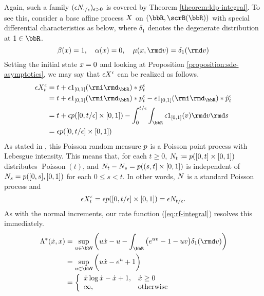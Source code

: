 \begin{example}[Poisson]
  Again, such a family $(\epsilon N_{\cdot/\epsilon})_{\epsilon>0}$ is covered by Theorem \ref{theorem:ldp-integral}.
  To see this, consider a base affine process $X$ on $(\bbR, \scrB(\bbR))$ with special differential characteristics as below, where $\delta_1$ denotes the degenerate distribution at $1 \in \bbR$.
  \begin{equation*}
    \affDrift(\stateVar) = 1, \quad \affDiff(\stateVar) = 0, \quad \affJump(\stateVar, \rmd\markVar) = \delta_1(\rmd\markVar)
  \end{equation*}
  Setting the initial state $x = 0$ and looking at Proposition \ref{proposition:sde-asymptotics}, we may say that $\epsilon X^\epsilon$ can be realized as follows.
  \begin{align*}
    \Xe_t 
    &= t + \epsilon 1_{[0,1]}(\id_\bbR) \ast \compensate{\poisRM^\epsilon}_t \\
    &= t + \epsilon 1_{[0,1]}(\id_\bbR) \ast \poisRM^\epsilon_t - \epsilon 1_{[0,1]}(\id_\bbR) \ast \predproj{\poisRM^\epsilon}_t \\
    &= t + \epsilon \poisRM([0,t/\epsilon] \times [0,1]) - \int_0^{t/\epsilon} \int_\bbR \epsilon 1_{[0,1]}(\markVar) \rmd\markVar \rmd s \\
    &= \epsilon \poisRM([0,t/\epsilon] \times [0,1])
  \end{align*}
  As stated in \cite[Theorem II.4.8]{jacod2003}, this Poisson random measure $p$ is a Poisson point process with Lebesgue intensity.
  This means that, for each $t \geq 0$, $N_t \coloneqq p([0,t] \times [0,1])$ distributes $\operatorname{Poisson}(t)$, and $N_t - N_s = p((s,t] \times [0,1])$ is independent of $N_s = p([0,s], [0,1])$ for each $0 \leq s < t$.
  In other words, $N$ is a standard Poisson process and
  \begin{equation*}
    \epsilon X^\epsilon_t = \epsilon p([0,t/\epsilon] \times [0,1]) = \epsilon N_{t/\epsilon}.
  \end{equation*}
  As with the normal increments, our rate function (\ref{eq:rf-integral}) resolves this immediately.
  \begin{align*}
    \ode^*(\diffVar, \stateVar) 
    &= \sup_{\momentVar\in\vecSpace} \bigg( \momentVar\diffVar - \momentVar - \int_\bbR \big( e^{\momentVar\markVar} - 1 - \momentVar\markVar \big) \delta_1(\rmd\markVar) \bigg)  \\
    &= \sup_{\momentVar\in\vecSpace} \bigg( \momentVar\diffVar - e^\momentVar + 1 \bigg) \\
    &= \left\{\begin{array}{ll}
      \diffVar \log\diffVar - \diffVar + 1, & \diffVar \geq 0 \\
      \infty, & \text{otherwise}
    \end{array}\right.
  \end{align*}
\end{example}
